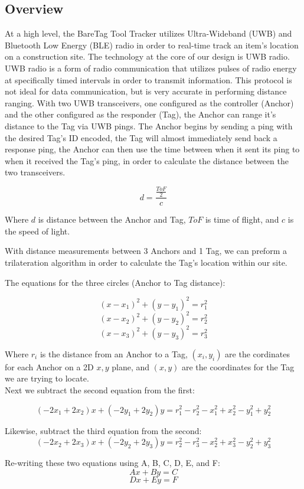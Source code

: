\documentclass[conference]{IEEEtran}
\begin{document}
\subsection{Overview}
At a high level, the BareTag Tool Tracker utilizes Ultra-Wideband (UWB) and 
Bluetooth Low Energy (BLE) radio in order to real-time track an 
item's location on a construction site. The technology at the core of our 
design is UWB radio. UWB radio is a form of radio communication that 
utilizes pulses of radio energy at specifically timed intervals in order 
to transmit information. This protocol is not ideal for data communication, 
but is very accurate in performing distance ranging. With two UWB 
transceivers, one configured as the controller (Anchor) and the other 
configured as the responder (Tag), the Anchor can range it's distance
to the Tag via UWB pings. The Anchor begins by sending a ping with 
the desired Tag's ID encoded, the Tag will almost immediately send 
back a response ping, the Anchor can then use the time between when it 
sent its ping to when it received the Tag's ping, in order to 
calculate the distance between the two transceivers. 

\[ d = \frac{\frac{ToF}{2}}{c} \]

Where $d$ is distance between the Anchor and Tag, 
$ToF$ is time of flight, and $c$ is the speed of light.

With distance measurements between 3 Anchors and 1 Tag, we
can preform a trilateration algorithm in order to calculate
the Tag's location within our site.

The equations for the three circles (Anchor to Tag distance):

\[(x - x_1)^2 + (y - y_1)^2 = r_1^2\]
\[(x - x_2)^2 + (y - y_2)^2 = r_2^2\]
\[(x - x_3)^2 + (y - y_3)^2 = r_3^2\]

Where $r_i$ is the distance from an Anchor to a Tag, $(x_i, y_i)$ are 
the cordinates for each Anchor on a 2D $x,y$ plane, and $(x,y)$ are the coordinates
for the Tag we are trying to locate.\\
Next we subtract the second equation from the first:

\[(-2x_1 + 2x_2)x + (-2y_1 + 2y_2)y = r_1^2 - r_2^2 - x_1^2 + x_2^2 - y_1^2 + y_2^2\]

Likewise, subtract the third equation from the second:
\[(-2x_2 + 2x_3)x + (-2y_2 + 2y_3)y = r_2^2 - r_3^2 - x_2^2 + x_3^2 - y_2^2 + y_3^2\]

Re-writing these two equations using A, B, C, D, E, and F:
\[Ax + By = C\]
\[Dx + Ey = F\]
\end{document}
